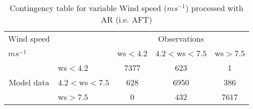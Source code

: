
\begin{table}[]
\begin{center}
\begin{tabular}{llccc}
\hline
{Wind speed}                                       &                                                    & \multicolumn{3}{c}{Observations}                 \\
{$m s^{-1}$}                                       &                             & ws$<4.2$   & $4.2<$ws$<7.5$ & ws$>7.5$ \\
\hline
\multicolumn{1}{c}{\multirow{3}{*}{Model data}}  & ws$<4.2$          & 7377                & 623                       & 1              \\
                                                 & $4.2<$ws$<7.5$ & 628                & 6950                       & 386              \\
                                                 & ws$>7.5$          & 0                & 432                       & 7617              \\
\hline
\end{tabular}
\end{center}
\caption{Contingency table for variable Wind speed ($m s^{-1}$) processed with AR (i.e. AFT)}
\label{tab:contingency}
\end{table}
